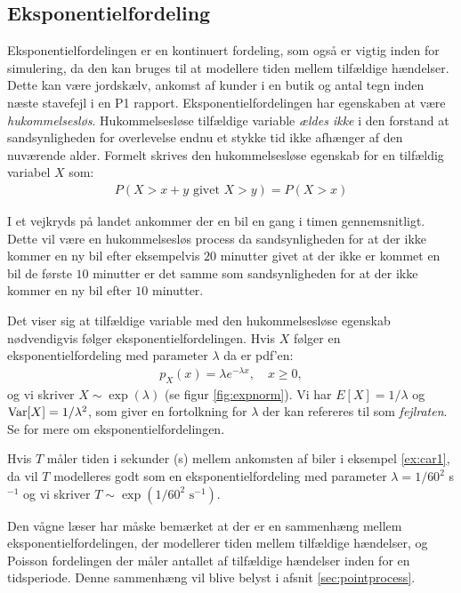 \subsection{Eksponentielfordeling}
Eksponentielfordelingen er en kontinuert fordeling, som også er vigtig inden for simulering, da den kan bruges til at modellere tiden mellem tilfældige hændelser. Dette kan være jordskælv, ankomst af kunder i en butik og antal tegn inden næste stavefejl i en P1 rapport. Eksponentielfordelingen har egenskaben at være \emph{hukommelsesløs}. Hukommelsesløse tilfældige variable \emph{ældes ikke} i den forstand at sandsynligheden for overlevelse endnu et stykke tid ikke afhænger af den nuværende alder. Formelt skrives den hukommelsesløse egenskab for en tilfældig variabel $X$ som: 
\begin{align*}
P(X > x + y \text{ givet } X > y) = P(X > x)
\end{align*}
\begin{example} \label{ex:car1}
I et vejkryds på landet ankommer der en bil en gang i timen gennemsnitligt. Dette vil være en hukommelsesløs process da sandsynligheden for at der ikke kommer en ny bil efter eksempelvis $20$ minutter givet at der ikke er kommet en bil de første $10$ minutter er det samme som sandsynligheden for at der ikke kommer en ny bil efter $10$ minutter. 
\end{example}
Det viser sig at tilfældige variable med den hukommelsesløse egenskab nødvendigvis følger eksponentielfordelingen. Hvis $X$ følger en eksponentielfordeling med parameter $\lambda$ da er pdf'en:
\begin{align*}
p_X(x) = \lambda e^{-\lambda x}, \quad x \geq 0,
\end{align*}
og vi skriver $X \sim \exp(\lambda)$ (se figur \ref{fig:expnorm}). Vi har $E[X] = 1/\lambda$ og $\operatorname{Var}[X] = 1/\lambda^2$, som giver en fortolkning for $\lambda$ der kan refereres til som \emph{fejlraten}. Se \cite[123-127]{olofsson2012} for mere om eksponentielfordelingen. 
\begin{example} \label{ex:car2}
Hvis $T$ måler tiden i sekunder (s) mellem ankomsten af biler i eksempel \ref{ex:car1}, da vil $T$ modelleres godt som en eksponentielfordeling med parameter $\lambda = 1/60^2$ s$^{-1}$ og vi skriver $T \sim \exp(1/60^{2} \text{ s}^{-1})$. 
\end{example}
Den vågne læser har måske bemærket at der er en sammenhæng mellem eksponentielfordelingen, der modellerer tiden mellem tilfældige hændelser, og Poisson fordelingen der måler antallet af tilfældige hændelser inden for en tidsperiode. Denne sammenhæng vil blive belyst i afsnit \ref{sec:pointprocess}. 
